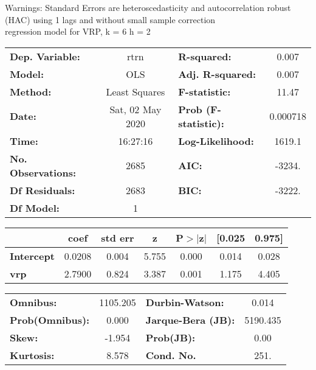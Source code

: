 Warnings: \newline
 [1] Standard Errors are heteroscedasticity and autocorrelation robust (HAC) using 1 lags and without small sample correction\\ 

regression model for VRP, k = 6 h = 2\begin{center}
\begin{tabular}{lclc}
\toprule
\textbf{Dep. Variable:}    &       rtrn       & \textbf{  R-squared:         } &     0.007   \\
\textbf{Model:}            &       OLS        & \textbf{  Adj. R-squared:    } &     0.007   \\
\textbf{Method:}           &  Least Squares   & \textbf{  F-statistic:       } &     11.47   \\
\textbf{Date:}             & Sat, 02 May 2020 & \textbf{  Prob (F-statistic):} &  0.000718   \\
\textbf{Time:}             &     16:27:16     & \textbf{  Log-Likelihood:    } &    1619.1   \\
\textbf{No. Observations:} &        2685      & \textbf{  AIC:               } &    -3234.   \\
\textbf{Df Residuals:}     &        2683      & \textbf{  BIC:               } &    -3222.   \\
\textbf{Df Model:}         &           1      & \textbf{                     } &             \\
\bottomrule
\end{tabular}
\begin{tabular}{lcccccc}
                   & \textbf{coef} & \textbf{std err} & \textbf{z} & \textbf{P$> |$z$|$} & \textbf{[0.025} & \textbf{0.975]}  \\
\midrule
\textbf{Intercept} &       0.0208  &        0.004     &     5.755  &         0.000        &        0.014    &        0.028     \\
\textbf{vrp}       &       2.7900  &        0.824     &     3.387  &         0.001        &        1.175    &        4.405     \\
\bottomrule
\end{tabular}
\begin{tabular}{lclc}
\textbf{Omnibus:}       & 1105.205 & \textbf{  Durbin-Watson:     } &    0.014  \\
\textbf{Prob(Omnibus):} &   0.000  & \textbf{  Jarque-Bera (JB):  } & 5190.435  \\
\textbf{Skew:}          &  -1.954  & \textbf{  Prob(JB):          } &     0.00  \\
\textbf{Kurtosis:}      &   8.578  & \textbf{  Cond. No.          } &     251.  \\
\bottomrule
\end{tabular}
\end{center}

